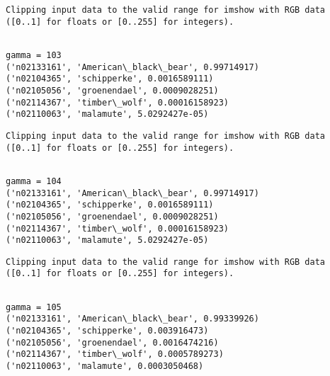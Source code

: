 \documentclass[11pt]{article}
\begin{document}
    \begin{Verbatim}[commandchars=\\\{\}]
Clipping input data to the valid range for imshow with RGB data ([0..1] for floats or [0..255] for integers).

    \end{Verbatim}

    \begin{Verbatim}[commandchars=\\\{\}]

gamma = 103
('n02133161', 'American\_black\_bear', 0.99714917)
('n02104365', 'schipperke', 0.0016589111)
('n02105056', 'groenendael', 0.0009028251)
('n02114367', 'timber\_wolf', 0.00016158923)
('n02110063', 'malamute', 5.0292427e-05)

    \end{Verbatim}

    \begin{Verbatim}[commandchars=\\\{\}]
Clipping input data to the valid range for imshow with RGB data ([0..1] for floats or [0..255] for integers).

    \end{Verbatim}

    \begin{Verbatim}[commandchars=\\\{\}]

gamma = 104
('n02133161', 'American\_black\_bear', 0.99714917)
('n02104365', 'schipperke', 0.0016589111)
('n02105056', 'groenendael', 0.0009028251)
('n02114367', 'timber\_wolf', 0.00016158923)
('n02110063', 'malamute', 5.0292427e-05)

    \end{Verbatim}

    \begin{Verbatim}[commandchars=\\\{\}]
Clipping input data to the valid range for imshow with RGB data ([0..1] for floats or [0..255] for integers).

    \end{Verbatim}

    \begin{Verbatim}[commandchars=\\\{\}]

gamma = 105
('n02133161', 'American\_black\_bear', 0.99339926)
('n02104365', 'schipperke', 0.003916473)
('n02105056', 'groenendael', 0.0016474216)
('n02114367', 'timber\_wolf', 0.0005789273)
('n02110063', 'malamute', 0.0003050468)

    \end{Verbatim}
\end{document}
